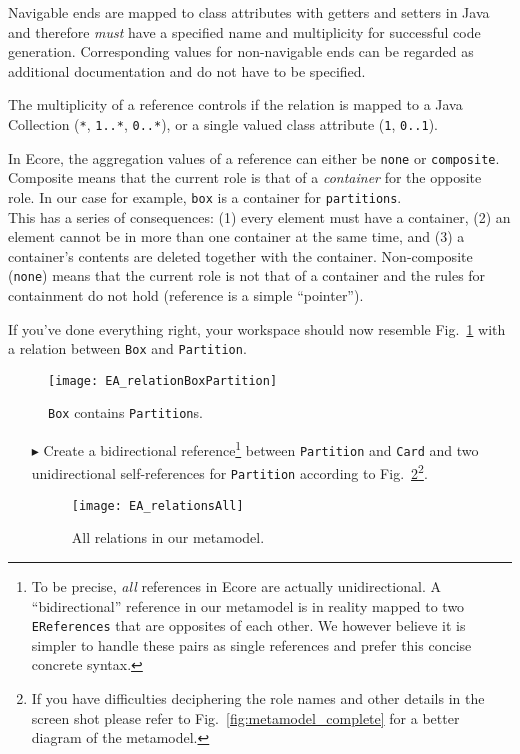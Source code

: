 Navigable ends are mapped to class attributes with getters and setters in Java and therefore \emph{must} have a specified name and  multiplicity for successful code generation.
Corresponding values for non-navigable ends can  be regarded as additional documentation and do not have to be specified.

The multiplicity of a reference controls if the relation is mapped to a Java Collection (\texttt{*},  \texttt{1..*}, \texttt{0..*}), or a single valued class attribute (\texttt{1}, \texttt{0..1}).

In Ecore, the aggregation values of a reference can either be \texttt{none} or \texttt{com\-po\-site}.
Composite means that the current role is that of a \emph{container} for the opposite role.
In our case for example, \texttt{box} is a container for \texttt{partitions}.\\
This has a series of consequences: (1) every element must have a container, (2) an element cannot be in more than one container at the same time, and (3) a container's contents are deleted together with the container.
Non-composite (\texttt{none}) means that the current role is not that of a container and the rules for containment do not hold (reference is a simple ``pointer'').

If you've done everything right, your workspace should now resemble Fig.~\ref{fig:ereference_completed} with a relation between \texttt{Box} and \texttt{Partition}.

\begin{figure}[htbp]
	\centering
  \texttt{[image: EA\_relationBoxPartition]}
	\caption{\texttt{Box} contains \texttt{Partition}s.}
	\label{fig:ereference_completed}
\end{figure}
\FloatBarrier

\begin{enumerate}
\item[$\blacktriangleright$] Create a bidirectional reference\footnote{To be precise, \emph{all} references in Ecore are actually unidirectional.
A ``bidirectional'' reference in our metamodel is in reality mapped to two \texttt{EReferences} that are opposites of each other.
We however believe it is simpler to handle these pairs as single references and prefer this concise concrete syntax.} between \texttt{Partition} and \texttt{Card} and two unidirectional self-references for \texttt{Partition} according to Fig.~\ref{fig:ereferences_all}\footnote{If you have difficulties deciphering the role names and other details in the screen shot please refer to Fig.~\ref{fig:metamodel_complete} for a better diagram of the metamodel.}.

\begin{figure}[htbp]
	\centering
  \texttt{[image: EA\_relationsAll]}
	\caption{All relations in our metamodel.}
	\label{fig:ereferences_all}
\end{figure}
\end{enumerate}
\FloatBarrier


